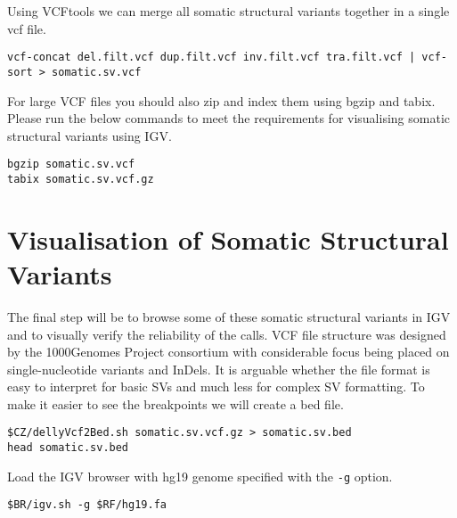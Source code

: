 \begin{steps}
Using VCFtools we can merge all somatic structural variants together in a single vcf file.
\begin{lstlisting}
vcf-concat del.filt.vcf dup.filt.vcf inv.filt.vcf tra.filt.vcf | vcf-sort > somatic.sv.vcf
\end{lstlisting}
\end{steps}

\begin{information}
For large VCF files you should also zip and index them using bgzip and tabix. Please run the below commands to meet the requirements for visualising somatic structural variants using IGV.  
\end{information}

\begin{steps}
\begin{lstlisting}
bgzip somatic.sv.vcf
tabix somatic.sv.vcf.gz
\end{lstlisting}
\end{steps}



\section{Visualisation of Somatic Structural Variants}

\begin{information}
The final step will be to browse some of these somatic structural variants in IGV and to visually verify the reliability of the calls. VCF file structure was designed by the 1000Genomes Project consortium with considerable focus being placed on single-nucleotide variants and InDels. It is arguable whether the file format is easy to interpret for basic SVs and much less for complex SV formatting. To make it easier to see the breakpoints we will create a bed file. 

\end{information}
\begin{steps}
\begin{lstlisting}
$CZ/dellyVcf2Bed.sh somatic.sv.vcf.gz > somatic.sv.bed
head somatic.sv.bed
\end{lstlisting}
\end{steps}

\begin{steps}
Load the IGV browser with hg19 genome specified with the \texttt{-g} option.
\begin{lstlisting}
$BR/igv.sh -g $RF/hg19.fa
\end{lstlisting}
\end{steps}

